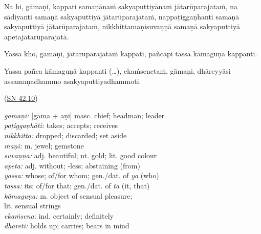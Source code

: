 \documentclass[11pt,oneside]{memoir}
\begin{document}
\begin{widecols}
Na hi, gāmaṇi, kappati samaṇānaṁ sakyaputtiyānaṁ jātarūparajataṁ, na sādiyanti samaṇā sakyaputtiyā jātarūparajataṁ, nappaṭiggaṇhanti samaṇā sakyaputtiyā jātarūparajataṁ, nikkhittamaṇisuvaṇṇā samaṇā sakyaputtiyā apetajātarūparajatā.

Yassa kho, gāmaṇi, jātarūparajataṁ kappati, pañcapi tassa kāmaguṇā kappanti.

Yassa pañca kāmaguṇā kappanti (…), ekaṁsenetaṁ, gāmaṇi, dhāreyyāsi assamaṇadhammo asakyaputtiyadhammoti.

(\href{https://suttacentral.net/sn42.10/pli/ms}{SN 42.10})

\columnbreak

\emph{gāmaṇi:} {[}gāma + aṇi] masc. chief; headman; leader \\
\emph{paṭiggaṇhāti:} takes; accepts; receives \\
\emph{nikkhitta:} dropped; discarded; set aside \\
\emph{maṇi:} m. jewel; gemstone \\
\emph{suvaṇṇa:} adj. beautiful; nt. gold; lit. good colour \\
\emph{apeta:} adj. without; -less; abstaining (from) \\
\emph{yassa:} whose; of/for whom; gen./dat. of \emph{ya} (who) \\
\emph{tassa:} its; of/for that; gen./dat. of \emph{ta} (it, that) \\
\emph{kāmaguṇa:} m. object of sensual pleasure; \\
lit. sensual strings \\
\emph{ekaṁsena:} ind. certainly; definitely \\
\emph{dhāreti:} holds up; carries; bears in mind
\end{widecols}

\bigskip
\end{document}

